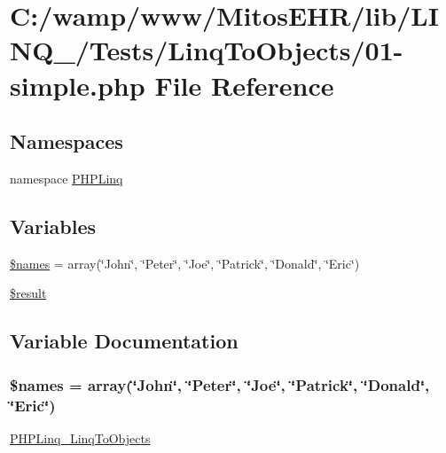 \hypertarget{_linq_to_objects_201-simple_8php}{\section{\-C\-:/wamp/www/\-Mitos\-E\-H\-R/lib/\-L\-I\-N\-Q\-\_/\-Tests/\-Linq\-To\-Objects/01-\/simple.php \-File \-Reference}
\label{_linq_to_objects_201-simple_8php}
}
\subsection*{\-Namespaces}
\begin{DoxyCompactItemize}
\item 
namespace \hyperlink{namespace_p_h_p_linq}{\-P\-H\-P\-Linq}
\end{DoxyCompactItemize}
\subsection*{\-Variables}
\begin{DoxyCompactItemize}
\item 
\hyperlink{_linq_to_objects_201-simple_8php_affd6fc4c8210d8b9b164c72a0332e732}{\$names} = array(\char`\"{}\-John\char`\"{}, \char`\"{}\-Peter\char`\"{}, \char`\"{}\-Joe\char`\"{}, \char`\"{}\-Patrick\char`\"{}, \char`\"{}\-Donald\char`\"{}, \char`\"{}\-Eric\char`\"{})
\item 
\hyperlink{_linq_to_objects_201-simple_8php_a112ef069ddc0454086e3d1e6d8d55d07}{\$result}
\end{DoxyCompactItemize}


\subsection{\-Variable \-Documentation}
\hypertarget{_linq_to_objects_201-simple_8php_affd6fc4c8210d8b9b164c72a0332e732}{
\subsubsection[{\$names}]{\setlength{\rightskip}{0pt plus 5cm}\$names = array(\char`\"{}\-John\char`\"{}, \char`\"{}\-Peter\char`\"{}, \char`\"{}\-Joe\char`\"{}, \char`\"{}\-Patrick\char`\"{}, \char`\"{}\-Donald\char`\"{}, \char`\"{}\-Eric\char`\"{})}}\label{_linq_to_objects_201-simple_8php_affd6fc4c8210d8b9b164c72a0332e732}
\hyperlink{class_p_h_p_linq___linq_to_objects}{\-P\-H\-P\-Linq\-\_\-\-Linq\-To\-Objects} 

